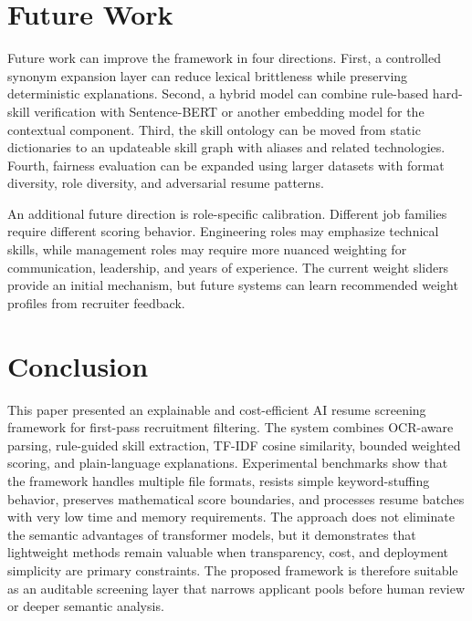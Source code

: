 \documentclass[conference]{IEEEtran}
\begin{document}
\section{Future Work}
Future work can improve the framework in four directions. First, a controlled synonym expansion layer can reduce lexical brittleness while preserving deterministic explanations. Second, a hybrid model can combine rule-based hard-skill verification with Sentence-BERT or another embedding model for the contextual component. Third, the skill ontology can be moved from static dictionaries to an updateable skill graph with aliases and related technologies. Fourth, fairness evaluation can be expanded using larger datasets with format diversity, role diversity, and adversarial resume patterns.

An additional future direction is role-specific calibration. Different job families require different scoring behavior. Engineering roles may emphasize technical skills, while management roles may require more nuanced weighting for communication, leadership, and years of experience. The current weight sliders provide an initial mechanism, but future systems can learn recommended weight profiles from recruiter feedback.

\section{Conclusion}
This paper presented an explainable and cost-efficient AI resume screening framework for first-pass recruitment filtering. The system combines OCR-aware parsing, rule-guided skill extraction, TF-IDF cosine similarity, bounded weighted scoring, and plain-language explanations. Experimental benchmarks show that the framework handles multiple file formats, resists simple keyword-stuffing behavior, preserves mathematical score boundaries, and processes resume batches with very low time and memory requirements. The approach does not eliminate the semantic advantages of transformer models, but it demonstrates that lightweight methods remain valuable when transparency, cost, and deployment simplicity are primary constraints. The proposed framework is therefore suitable as an auditable screening layer that narrows applicant pools before human review or deeper semantic analysis.
\end{document}
